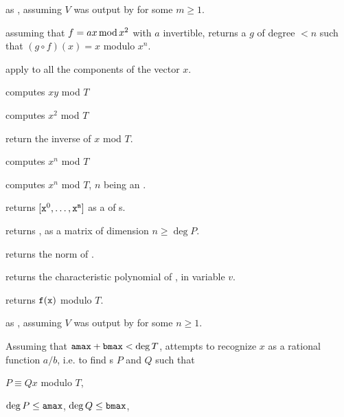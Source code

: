  as ,
assuming $V$ was output by  for some $m\geq 1$.

 assuming that $f = a\*x \mod{x^2}$
with $a$ invertible, returns a  $g$ of degree $< n$ such that $(g
\circ f)(x) = x$ modulo $x^n$.


 apply 
to all the components of the vector $x$.


 computes $xy$ mod $T$

 computes $x^2$ mod $T$

 return the inverse of $x$ mod $T$.

 computes $x^n$ mod $T$

 computes $x^n$ mod $T$,
$n$ being an .

 returns $[{\tt x}^0,
\dots, {\tt x}^{\tt n}]$ as a  of s.

 returns
, as a matrix of dimension $n \geq \deg P$.

 returns the norm of .

 returns the characteristic
polynomial of , in variable $v$.

 returns ${\tt f}({\tt x})$ modulo
$T$.

 as ,
assuming $V$ was output by  for some $n\geq 1$.

Assuming that ${\tt amax}+{\tt bmax}<\deg T$, attempts to recognize $x$ as a
rational function $a/b$, i.e. to find s $P$ and $Q$ such that

\item $P \equiv Q x$ modulo $T$,

\item $\deg P \leq {\tt amax}$, $\deg Q \leq {\tt bmax}$,

